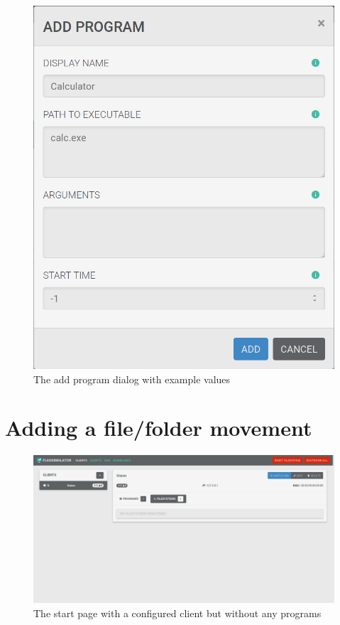 \documentclass[accentcolor=tud1a, paper=a4, colorback]{tudreport}
\begin{document}
	\begin{figure}[H]
		\centering
		\label{add_program}
		\includegraphics[width=.4\textwidth]{add_program}
		\caption{The add program dialog with example values}
	\end{figure}

	\section{Adding a file/folder movement}

	\begin{figure}[H]
		\centering
		\label{startpage_without_files}
		\includegraphics[width=.9\textwidth]{startpage_without_files}
		\caption{The start page with a configured client but without any programs}
	\end{figure}
\end{document}
